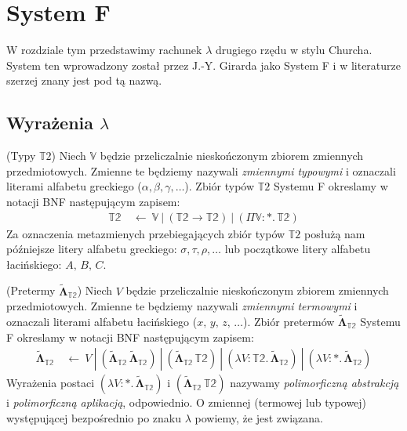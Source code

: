 \section{System F}\label{sec:system_f}
W rozdziale tym przedstawimy rachunek \(\lambda\) drugiego rzędu w stylu Churcha. System ten wprowadzony został przez J.-Y.  Girarda jako System F i w literaturze szerzej znany jest pod tą nazwą. 

\subsection{Wyrażenia \(\lambda\)}

\begin{definicja}(Typy \(\mathbb{T}2\))
  Niech \(\mathbb{V}\) będzie przeliczalnie nieskończonym zbiorem zmiennych przedmiotowych. Zmienne te będziemy nazywali \emph{zmiennymi typowymi} i oznaczali literami alfabetu greckiego (\(\alpha, \beta, \gamma, \dots\)). Zbiór typów \(\mathbb{T}2\) Systemu F okreslamy w notacji BNF następującym zapisem:
  \begin{align*}
    \mathbb{T2}\ &\leftarrow\ \mathbb{V}\ |\ (\mathbb{T2}\to\mathbb{T2})\ |\ (\Pi \mathbb{V}:*.\,\mathbb{T2})
  \end{align*}
Za oznaczenia metazmienych przebiegających zbiór typów \(\mathbb{T}2\) posłużą nam późniejsze litery alfabetu greckiego: \(\sigma,\tau,\rho,\dots\) lub początkowe litery alfabetu łacińskiego: \(A,\, B,\, C\).
\end{definicja}
\begin{definicja}(Pretermy \(\mathbf{\tilde\Lambda}_\mathbb{T2}\))
  Niech \(V\) będzie przeliczalnie nieskończonym zbiorem zmiennych przedmiotowych. Zmienne te będziemy nazywali \emph{zmiennymi termowymi} i oznaczali literami alfabetu łacińskiego (\(x,\, y,\, z,\,\dots\)). Zbiór pretermów \(\mathbf{\tilde\Lambda}_\mathbb{T2}\) Systemu F okreslamy w notacji BNF następującym zapisem:
  \begin{align*}
      \mathbf{\tilde\Lambda}_\mathbb{T2}\ &\leftarrow \ V\ |\ (\mathbf{\tilde\Lambda}_\mathbb{T2}\,\mathbf{\tilde\Lambda}_\mathbb{T2}) \ |\ (\mathbf{\tilde\Lambda}_\mathbb{T2}\,\mathbb{T2}) \ |\ (\lambda V:\mathbb{T2}.\, \mathbf{\tilde\Lambda}_\mathbb{T2})\ |\ (\lambda V:*.\, \mathbf{\tilde\Lambda}_\mathbb{T2})
  \end{align*}
  Wyrażenia postaci \((\lambda V:*.\, \mathbf{\tilde\Lambda}_\mathbb{T2})\) i \((\mathbf{\tilde\Lambda}_\mathbb{T2}\,\mathbb{T2})\) nazywamy \emph{polimorficzną abstrakcją} i \emph{polimorficzną aplikacją}, odpowiednio. O zmiennej (termowej lub typowej) występującej bezpośrednio po znaku \(\lambda\) powiemy, że jest związana.  
\end{definicja}

